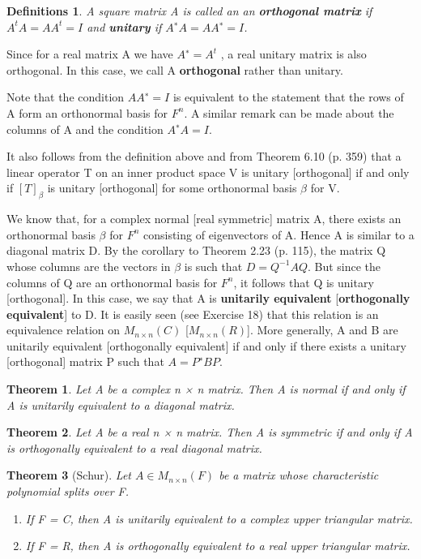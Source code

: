 \documentclass{article}
\newcommand{\bd}[1]{\textbf{#1}}
\newcommand{\enumalph}[0]{\begin{enumerate}[label=(\alph*)]}
\theoremstyle{plain}
\newtheorem{theorem}{Theorem}[section]
\newtheorem*{definitions}{Definitions}
\theoremstyle{plain} %
\begin{document}
\begin{definitions}
  A square matrix A is called an an \bd{orthogonal matrix} if $A^tA = AA^t = I$ and \bd{unitary} if $A^∗A = AA^∗ = I$.
\end{definitions}

Since for a real matrix A we have $A^∗ = A^t$ , a real unitary matrix is also orthogonal. In this case, we call A \bd{orthogonal} rather than unitary.

Note that the condition $AA^∗ = I$ is equivalent to the statement that the rows of A form an orthonormal basis for $F^n$. A similar remark can be made about the columns of A and the condition $A^∗A = I$.

It also follows from the definition above and from Theorem 6.10 (p. 359) that a linear operator T on an inner product space V is unitary [orthogonal] if and only if $[T]_\beta$ is unitary [orthogonal] for some orthonormal basis $\beta$ for V.

We know that, for a complex normal [real symmetric] matrix A, there exists an orthonormal basis $\beta$ for $F^n$ consisting of eigenvectors of A. Hence A is similar to a diagonal matrix D. By the corollary to Theorem 2.23 (p. 115), the matrix Q whose columns are the vectors in $\beta$ is such that $D = Q^{-1}AQ$. But since the columns of Q are an orthonormal basis for $F^n$, it follows that Q is unitary [orthogonal]. In this case, we say that A is \bd{unitarily equivalent} [\bd{orthogonally equivalent}] to D. It is easily seen (see Exercise 18) that this relation is an equivalence relation on $M_{n×n}(C)$ [$M_{n×n}(R)$]. More generally, A and B are unitarily equivalent [orthogonally equivalent] if and only if there exists a unitary [orthogonal] matrix P such that $A = P^∗BP$.

\begin{theorem}
  Let A be a complex n × n matrix. Then A is normal if and only if A is unitarily equivalent to a diagonal matrix.
\end{theorem}

\begin{theorem}
  Let A be a real n × n matrix. Then A is symmetric if and only if A is orthogonally equivalent to a real diagonal matrix.
\end{theorem}

\begin{theorem}[Schur]
  Let $A \in M_{n×n}(F)$ be a matrix whose characteristic polynomial splits over F.
  \enumalph
  \item If F = C, then A is unitarily equivalent to a complex upper triangular matrix.
  \item If F = R, then A is orthogonally equivalent to a real upper triangular matrix.
  \end{enumerate}
\end{theorem}
\end{document}

